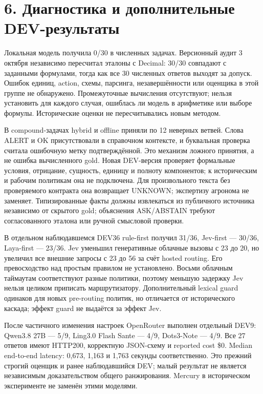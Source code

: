 \documentclass[14pt,a4paper]{extarticle}
\begin{document}
\section*{6. Диагностика и дополнительные DEV-результаты}

Локальная модель получила 0/30 в численных задачах. Версионный аудит 3 октября независимо пересчитал эталоны с Decimal: 30/30 совпадают с заданными формулами, тогда как все 30 численных ответов выходят за допуск. Ошибок единиц, action, схемы, парсинга, незавершённости или оценщика в этой группе не обнаружено. Промежуточные вычисления отсутствуют; нельзя установить для каждого случая, ошиблась ли модель в арифметике или выборе формулы. Исторические оценки не пересчитывались новым методом.


В compound-задачах hybrid и offline приняли по 12 неверных ветвей. Слова ALERT и OK присутствовали в справочном контексте, и буквальная проверка считала ошибочную метку подтверждённой. Это механизм ложного принятия, а не ошибка вычисленного gold. Новая DEV-версия проверяет формальные условия, отрицание, сущность, единицу и полноту компонентов; к историческим и рабочим политикам она не подключена. Для произвольного текста без проверяемого контракта она возвращает UNKNOWN; экспертизу агронома не заменяет. Типизированные факты должны извлекаться из публичного источника независимо от скрытого gold; объяснения ASK/ABSTAIN требуют согласованного эталона или ручной смысловой проверки.


В отдельном наблюдавшемся DEV36 rule-first получил 31/36, Jev-first --- 30/36, Laya-first --- 23/36. Jev уменьшил генеративные облачные вызовы с 23 до 20, но увеличил все внешние запросы с 23 до 56 за счёт hosted routing. Его превосходство над простым правилом не установлено. Восьми облачным таймаутам соответствуют разные политики, поэтому меньшую задержку Jev нельзя целиком приписать маршрутизатору. Дополнительный lexical guard одинаков для новых pre-routing политик, но отличается от исторического каскада; эффект guard не выдаётся за эффект Jev.


После частичного изменения настроек OpenRouter выполнен отдельный DEV9: Qwen3.8 27B --- 5/9, Ling3.0 Flash Sante --- 4/9, Dots3-Note --- 4/9. Все 27 ответов имеют HTTP200, корректную JSON-схему и reported cost \$0. Median end-to-end latency: 0,673, 1,163 и 1,763 секунды соответственно. Это прежний строгий оценщик и ранее наблюдавшийся DEV; малый результат не является независимым доказательством общего ранжирования. Mercury в историческом эксперименте не заменён этими моделями.
\end{document}
